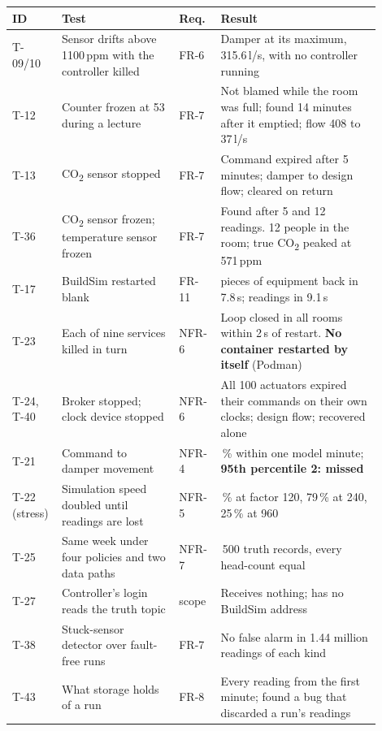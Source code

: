 \documentclass[11pt]{article}
\newcommand{\cotwo}{CO\textsubscript{2}}
\begin{document}
\begin{longtable}[]{@{}>{\raggedright\arraybackslash}p{0.09\linewidth}>{\raggedright\arraybackslash}p{0.30\linewidth}>{\raggedright\arraybackslash}p{0.10\linewidth}>{\raggedright\arraybackslash}p{0.41\linewidth}@{}}
\toprule
\textbf{ID} & \textbf{Test} & \textbf{Req.} & \textbf{Result} \\
\midrule
\endhead
T-09/10 & Sensor drifts above 1100\,ppm with the controller killed & FR-6 & Damper at its maximum, 315.6\,l/s, with no controller running \\
T-12 & Counter frozen at 53 during a lecture & FR-7 & Not blamed while the room was full; found 14 minutes after it emptied; flow 408 to 37\,l/s \\
T-13 & \cotwo{} sensor stopped & FR-7 & Command expired after 5 minutes; damper to design flow; cleared on return \\
T-36 & \cotwo{} sensor frozen; temperature sensor frozen & FR-7 & Found after 5 and 12 readings. 12 people in the room; true \cotwo{} peaked at 571\,ppm \\
T-17 & BuildSim restarted blank & FR-11 & 253 pieces of equipment back in 7.8\,s; readings in 9.1\,s \\
T-23 & Each of nine services killed in turn & NFR-6 & Loop closed in all rooms within 2\,s of restart. \textbf{No container restarted by itself} (Podman) \\
T-24, T-40 & Broker stopped; clock device stopped & NFR-6 & All 100 actuators expired their commands on their own clocks; design flow; recovered alone \\
T-21 & Command to damper movement & NFR-4 & 93\,\% within one model minute; \textbf{95th percentile 2: missed} \\
T-22 (stress) & Simulation speed doubled until readings are lost & NFR-5 & 100\,\% at factor 120, 79\,\% at 240, 25\,\% at 960 \\
T-25 & Same week under four policies and two data paths & NFR-7 & 360\,500 truth records, every head-count equal \\
T-27 & Controller's login reads the truth topic & scope & Receives nothing; has no BuildSim address \\
T-38 & Stuck-sensor detector over fault-free runs & FR-7 & No false alarm in 1.44 million readings of each kind \\
T-43 & What storage holds of a run & FR-8 & Every reading from the first minute; found a bug that discarded a run's readings \\
\bottomrule
\end{longtable}
\end{document}
